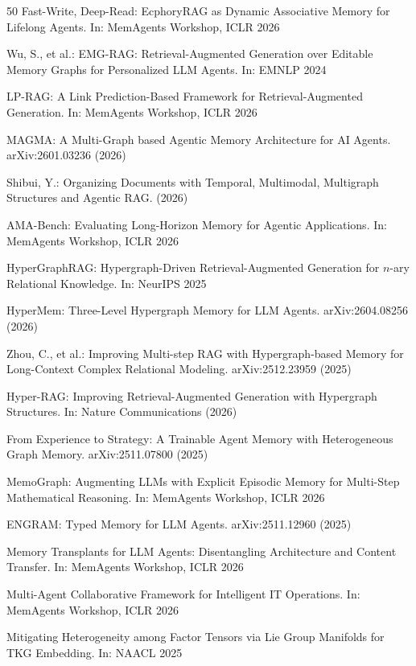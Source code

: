 \documentclass[hf]{ceurart}
\begin{document}
\begin{thebibliography}{50}
Fast-Write, Deep-Read: EcphoryRAG as Dynamic Associative Memory
for Lifelong Agents. In: MemAgents Workshop, ICLR 2026

Wu, S., et al.: EMG-RAG: Retrieval-Augmented Generation over Editable
Memory Graphs for Personalized LLM Agents. In: EMNLP 2024

LP-RAG: A Link Prediction-Based Framework for Retrieval-Augmented
Generation. In: MemAgents Workshop, ICLR 2026

MAGMA: A Multi-Graph based Agentic Memory Architecture for AI
Agents. arXiv:2601.03236 (2026)

Shibui, Y.: Organizing Documents with Temporal, Multimodal,
Multigraph Structures and Agentic RAG. (2026)

AMA-Bench: Evaluating Long-Horizon Memory for Agentic Applications.
In: MemAgents Workshop, ICLR 2026

HyperGraphRAG: Hypergraph-Driven Retrieval-Augmented Generation for
$n$-ary Relational Knowledge. In: NeurIPS 2025

HyperMem: Three-Level Hypergraph Memory for LLM Agents.
arXiv:2604.08256 (2026)

Zhou, C., et al.: Improving Multi-step RAG with Hypergraph-based Memory
for Long-Context Complex Relational Modeling. arXiv:2512.23959 (2025)

Hyper-RAG: Improving Retrieval-Augmented Generation with Hypergraph
Structures. In: Nature Communications (2026)

From Experience to Strategy: A Trainable Agent Memory with
Heterogeneous Graph Memory. arXiv:2511.07800 (2025)

MemoGraph: Augmenting LLMs with Explicit Episodic Memory for
Multi-Step Mathematical Reasoning. In: MemAgents Workshop, ICLR 2026

ENGRAM: Typed Memory for LLM Agents. arXiv:2511.12960 (2025)

Memory Transplants for LLM Agents: Disentangling Architecture and
Content Transfer. In: MemAgents Workshop, ICLR 2026

Multi-Agent Collaborative Framework for Intelligent IT Operations.
In: MemAgents Workshop, ICLR 2026

Mitigating Heterogeneity among Factor Tensors via Lie Group
Manifolds for TKG Embedding. In: NAACL 2025


\end{thebibliography}
\end{document}
